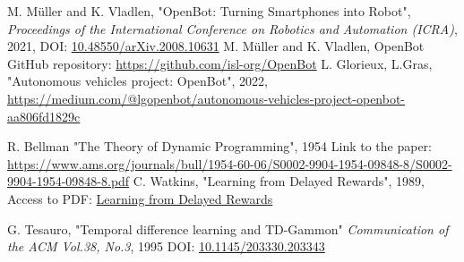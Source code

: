 \documentclass[12pt]{report}
\begin{document}
\begin{thebibliography}{99}
M. M{\"u}ller and K. Vladlen, 
"OpenBot: Turning Smartphones into Robot", 
\textit{Proceedings of the International Conference on Robotics and Automation (ICRA)}, 2021, 
DOI: \href{https://doi.org/10.48550/arXiv.2008.10631}{10.48550/arXiv.2008.10631}
M. M{\"u}ller and K. Vladlen, OpenBot GitHub repository: \href{https://github.com/isl-org/OpenBot}{https://github.com/isl-org/OpenBot}
L. Glorieux, L.Gras,
"Autonomous vehicles project: OpenBot", 2022,
\href{https://medium.com/@lgopenbot/autonomous-vehicles-project-openbot-aa806fd1829c}{https://medium.com/@lgopenbot/autonomous-vehicles-project-openbot-aa806fd1829c}

R. Bellman
"The Theory of Dynamic Programming", 1954
Link to the paper: \href{https://www.ams.org/journals/bull/1954-60-06/S0002-9904-1954-09848-8/S0002-9904-1954-09848-8.pdf}{https://www.ams.org/journals/bull/1954-60-06/S0002-9904-1954-09848-8/S0002-9904-1954-09848-8.pdf}
C. Watkins,
"Learning from Delayed Rewards", 1989,
Access to PDF: \href{https://www.researchgate.net/publication/33784417_Learning_From_Delayed_Rewards}{Learning from Delayed Rewards}

G. Tesauro,
"Temporal difference learning and TD-Gammon"
\textit{Communication of the ACM Vol.38, No.3}, 1995
DOI: \href{https://doi.org/10.1145/203330.203343}{10.1145/203330.203343}


\end{thebibliography}
\end{document}
